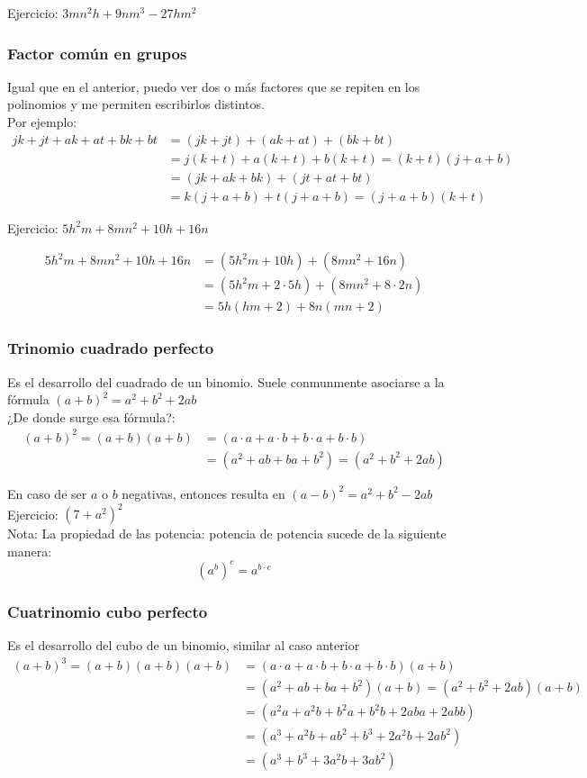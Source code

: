 \documentclass[a4paper]{article}
\begin{document}
Ejercicio: $3mn^2h+9nm^3-27hm^2$

\subsubsection{Factor común en grupos}

Igual que en el anterior, puedo ver dos o más factores que se repiten en los polinomios y me permiten escribirlos distintos.\\
Por ejemplo:
\begin{align*}
    jk+jt+ak+at+bk+bt &= (jk+jt)+(ak+at)+(bk+bt) \\
    &= j(k+t)+a(k+t)+b(k+t)=(k+t)(j+a+b)\\
    &=(jk+ak+bk)+(jt+at+bt)\\
    &=k(j+a+b)+t(j+a+b)=(j+a+b)(k+t)
\end{align*}

Ejercicio: $5h^2m+8mn^2+10h+16n$

\begin{align*}
5h^2m+8mn^2+10h+16n&= (5h^2m+10h)+(8mn^2+16n)\\
&=(5h^2m+2\cdot 5h)+(8mn^2+8\cdot 2n)\\
&=5h(hm+2)+8n(mn+2)
\end{align*}
\subsubsection{Trinomio cuadrado perfecto}
Es el desarrollo del cuadrado de un binomio. Suele conmunmente asociarse a la fórmula $(a+b)^2=a^2+b^2+2ab$\\
¿De donde surge esa fórmula?:
\begin{align*}
    (a+b)^2=(a+b)(a+b)&=(a\cdot a +a \cdot b + b\cdot a +b\cdot b)\\
    &=(a^2+ab+ba+b^2) =(a^2+b^2+2ab)
\end{align*}

En caso de ser $a$ o $b$ negativas, entonces resulta en $(a-b)^2=a^2+b^2-2ab$\\

Ejercicio: $(7+a^2)^2$\\

Nota: La propiedad de las potencia: potencia de potencia sucede de la siguiente manera:
\[
(a^b)^c=a^{b\cdot c}
\]

\subsubsection{Cuatrinomio cubo perfecto}
Es el desarrollo del cubo de un binomio, similar al caso anterior
\begin{align*}
    (a+b)^3=(a+b)(a+b)(a+b)&=(a\cdot a +a \cdot b + b\cdot a +b\cdot b)(a+b)\\
    &=(a^2+ab+ba+b^2)(a+b) =(a^2+b^2+2ab)(a+b)\\
    &=(a^2a+a^2b+b^2a+b^2b+2aba+2abb)\\
    &=(a^3+a^2b+ab^2+b^3+2a^2b+2ab^2)\\
    &=(a^3+b^3+3a^2b+3ab^2)
\end{align*}
\end{document}
